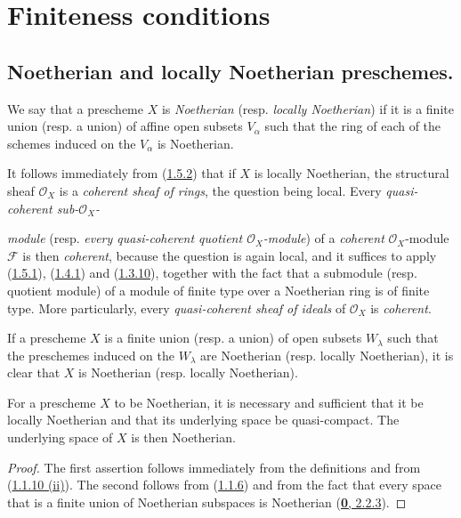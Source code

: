 \section{Finiteness conditions}
\label{section:I.6}

\subsection{Noetherian and locally Noetherian preschemes.}
\label{subsection:I.6.1}

\begin{definition}[6.1.1]
\label{I.6.1.1}
We say that a prescheme $X$ is \emph{Noetherian} (resp. \emph{locally
Noetherian}) if it is a finite union (resp. a union) of affine open subsets
$V_\alpha$ such that the ring of each of the schemes induced on the $V_\alpha$
is Noetherian.
\end{definition}

It follows immediately from (\hyperref[I.1.5.2]{1.5.2}) that if $X$ is
locally Noetherian, the structural sheaf $\mathscr{O}_X$ is a
\emph{coherent sheaf of rings}, the question being local. Every
\emph{quasi-coherent sub-$\mathscr{O}_X$-}

\emph{module} (resp. \emph{every quasi-coherent quotient $\mathscr{O}_X$-module})
of a \emph{coherent} $\mathscr{O}_X$-module $\mathscr{F}$ is then
\emph{coherent}, because the question is again local, and it suffices
to apply (\hyperref[I.1.5.1]{1.5.1}),
(\hyperref[I.1.4.1]{1.4.1}) and
(\hyperref[I.1.3.10]{1.3.10}), together with the fact that a submodule
(resp. quotient module) of a module of finite type over a Noetherian ring is
of finite type. More particularly, every \emph{quasi-coherent sheaf of
ideals} of $\mathscr{O}_X$ is \emph{coherent}.

If a prescheme $X$ is a finite union (resp. a union) of open subsets
$W_\lambda$ such that the preschemes induced on the $W_\lambda$ are
Noetherian (resp. locally Noetherian), it is clear that $X$ is Noetherian
(resp. locally Noetherian).

\begin{proposition}[6.1.2]
\label{I.6.1.2}
For a prescheme $X$ to be Noetherian, it is necessary and sufficient that it
be locally Noetherian and that its underlying space be quasi-compact.
The underlying space of $X$ is then Noetherian.
\end{proposition}

\begin{proof}
The first assertion follows immediately from the definitions and from
(\hyperref[I.1.1.10]{1.1.10 (ii)}). The second follows from
(\hyperref[I.1.1.6]{1.1.6}) and from the fact that every space that is a
finite union of Noetherian subspaces is Noetherian
(\hyperref[0.2.2.3]{\textbf{0}, 2.2.3}).
\end{proof}

